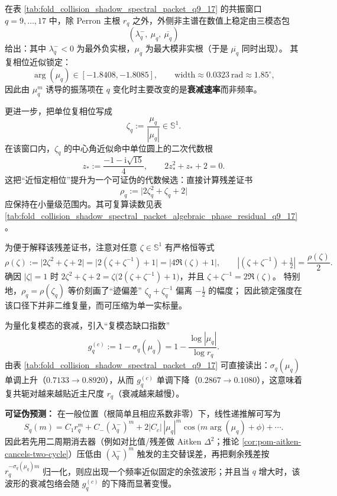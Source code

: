 



\begin{remark}\label{rem:pom-resonance-trimodal-phase-lock}
在表 \ref{tab:fold_collision_shadow_spectral_packet_q9_17} 的共振窗口 \(q=9,\dots,17\) 中，除 Perron 主根 \(r_q\) 之外，外侧非主谱在数值上稳定由三模态包
\[
(\lambda_q^-,\ \mu_q,\ \overline{\mu_q})
\]
给出：其中 \(\lambda_q^-<0\) 为最外负实根，\(\mu_q\) 为最大模非实根（于是 \(\overline{\mu_q}\) 同时出现）。
其复相位近似锁定：
\[
\arg(\mu_q)\in[-1.8408,-1.8085],
\qquad
\mathrm{width}\approx 0.0323\ \mathrm{rad}\approx 1.85^\circ,
\]
因此由 \(\mu_q^m\) 诱导的振荡项在 \(q\) 变化时主要改变的是\textbf{衰减速率}而非频率。
\par
更进一步，把单位复相位写成
\[
\zeta_q:=\frac{\mu_q}{|\mu_q|}\in\mathbb{S}^1.
\]
在该窗口内，\(\zeta_q\) 的中心角近似命中单位圆上的二次代数根
\[
z_\ast:=\frac{-1-\mathrm{i}\sqrt{15}}{4},
\qquad
2z_\ast^2+z_\ast+2=0.
\]
这把“近恒定相位”提升为一个可证伪的代数候选：直接计算残差证书
\[
\rho_q:=\bigl|2\zeta_q^2+\zeta_q+2\bigr|
\]
应保持在小量级范围内。其可复算读数见表 \ref{tab:fold_collision_shadow_spectral_packet_algebraic_phase_residual_q9_17}。
\par
为便于解释该残差证书，注意对任意 \(\zeta\in\mathbb{S}^1\) 有严格恒等式
\begin{equation}\label{eq:pom-phase-lock-residual-trace-equivalence}
\rho(\zeta):=\bigl|2\zeta^{2}+\zeta+2\bigr|
=\bigl|2(\zeta+\zeta^{-1})+1\bigr|
=\bigl|4\Re(\zeta)+1\bigr|,
\qquad
\left|(\zeta+\zeta^{-1})+\tfrac12\right|=\frac{\rho(\zeta)}{2}.
\end{equation}
确因 \(|\zeta|=1\) 时 \(2\zeta^2+\zeta+2=\zeta\bigl(2(\zeta+\zeta^{-1})+1\bigr)\)，并且 \(\zeta+\zeta^{-1}=2\Re(\zeta)\)。
特别地，\(\rho_q=\rho(\zeta_q)\) 等价刻画了“迹偏差” \(\zeta_q+\zeta_q^{-1}\) 偏离 \(-\tfrac12\) 的幅度；
因此锁定强度在该口径下并非二维复量，而可压缩为单一实标量。
\par
为量化复模态的衰减，引入“复模态缺口指数”
\[
g_q^{(c)}:=1-\sigma_q(\mu_q)
=1-\frac{\log|\mu_q|}{\log r_q}.
\]
由表 \ref{tab:fold_collision_shadow_spectral_packet_q9_17} 可直接读出：\(\sigma_q(\mu_q)\) 单调上升（\(0.7133\to 0.8920\)），从而
\(
g_q^{(c)}
\)
单调下降（\(0.2867\to 0.1080\)），这意味着复共轭对越来越贴近主尺度 \(r_q\)（衰减越来越慢）。
\par
\textbf{可证伪预测：}
在一般位置（根简单且相应系数非零）下，线性递推解可写为
\[
S_q(m)=C_1 r_q^m + C_- (\lambda_q^-)^m + 2|C_c|\,|\mu_q|^m\cos\!\bigl(m\arg(\mu_q)+\phi\bigr)+\cdots.
\]
因此若先用二周期消去器（例如对比值/残差做 Aitken \(\Delta^2\)；推论 \ref{cor:pom-aitken-cancels-two-cycle}）压低由 \((\lambda_q^-)^m\) 触发的主交替误差，再把剩余残差按 \(r_q^{-\sigma_q(\mu_q)m}\) 归一化，则应出现一个频率近似固定的余弦波形；并且当 \(q\) 增大时，该波形的衰减包络会随 \(g_q^{(c)}\) 的下降而显著变慢。
\end{remark}

